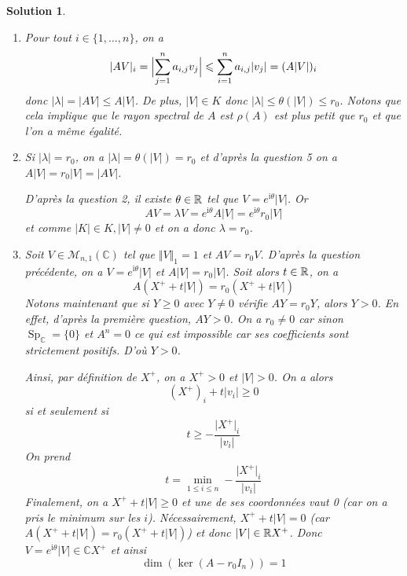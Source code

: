 \documentclass[12pt]{article}
\newtheorem{solution}{Solution}[section]
\theoremstyle{remark}
\newcommand{\C}{\mathbb{C}} \newcommand{\Q}{\mathbb{Q}}
\newcommand{\M}{\mathcal{M}} \renewcommand{\L}{\mathcal{L}}
\DeclareMathOperator{\Sp}{Sp} \DeclareMathOperator{\mat}{mat}
\numberwithin{equation}{section}
\begin{document}
\begin{solution}
\begin{enumerate}
		\item Pour tout $i\in\{1,\dots,n\}$, on a 
		$$\vert AV\vert_{i}=\Bigl\lvert\sum_{j=1}^{n}a_{i,j}v_{j}\Bigr\rvert\leqslant\sum_{i=1}^{n}a_{i,j}\vert v_{j}\vert=(A\vert V\vert)_{i}$$
		donc $\vert\lambda\vert=\vert AV\vert\leqslant A\vert V\vert$. De plus, $\vert V\vert\in K$ donc $\vert\lambda\vert\leqslant\theta(\vert V\vert)\leqslant r_{0}$. Notons que cela implique que le rayon spectral de $A$ est $\rho(A)$ est plus petit que $r_{0}$ et que l'on a même égalité.

		\item Si $\vert\lambda\vert=r_{0}$, on a $\vert\lambda\vert=\theta(\vert V\vert)=r_{0}$ et d'après la question 5 on a $A\vert V\vert=r_{0}\vert V\vert=\vert AV\vert$.
		
		D'après la question 2, il existe $\theta\in\mathbb{R}$ tel que $V=e^{\mathrm{i}\theta}\vert V\vert$. Or 
		$$AV=\lambda V=e^{\mathrm{i}\theta}A\vert V\vert=e^{\mathrm{i}\theta}r_{0}\vert V\vert$$
		et comme $\vert K\vert\in K, \vert V\vert\neq0$ et on a donc $\lambda=r_{0}$.

		\item Soit $V\in\M_{n,1}(\C)$ tel que $\Vert V\Vert_{1}=1$ et $AV=r_{0}V$. D'après la question précédente, on a $V=e^{\mathrm{i}\theta}\vert V\vert$ et $A\vert V\vert=r_{0}\vert V\vert$. Soit alors $t\in\mathbb{R}$, on a 
		$$A(X^{+}+t\vert V\vert)=r_{0}(X^{+}+t\vert V\vert)$$
		Notons maintenant que si $Y\geqslant0$ avec $Y\neq0$ vérifie $AY=r_{0}Y$, alors $Y>0$. En effet, d'après la première question, $AY>0$. On a $r_{0}\neq0$ car sinon $\Sp_{\C}=\{0\}$ et $A^{n}=0$ ce qui est impossible car ses coefficients sont strictement positifs. D'où $Y>0$.

		Ainsi, par définition de $X^{+}$, on a $X^{+}>0$ et $\vert V\vert>0$. On a alors 
		$$(X^{+})_{i}+t\vert v_{i}\vert\geqslant0$$
		si et seulement si
		$$t\geqslant -\frac{\vert X^{+}\vert_{i}}{\vert v_{i}\vert}$$
		On prend 
		$$t=\min\limits_{1\leqslant i\leqslant n}-\frac{\vert X^{+}\vert_{i}}{\vert v_{i}\vert}$$
		Finalement, on a $X^{+}+t\vert V\vert\geqslant0$ et une de ses coordonnées vaut 0 (car on a pris le minimum sur les $i$). Nécessairement, $X^{+}+t\vert V\vert=0$ (car $A(X^{+}+t\vert V\vert)=r_{0}(X^{+}+t\vert V\vert)$) et donc $\vert V\vert\in\mathbb{R} X^{+}$. Donc $V=e^{\mathrm{i}\theta}\vert V\vert\in\C X^{+}$ et ainsi 
		$$\dim(\ker(A-r_{0}I_{n}))=1$$
	\end{enumerate}
\end{solution}
\end{document}
